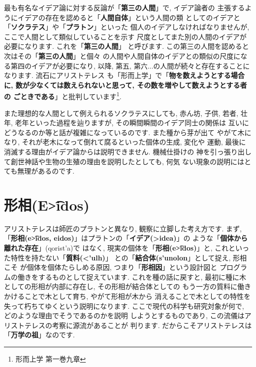 \documentclass[b5j,8pt,twocolumn]{ltjsarticle}
\newcommand{\textgreek}[1]{\begingroup\fontencoding{LGR}\selectfont#1\endgroup}
\begin{document}
最も有名なイデア論に対する反論が「\textbf{第三の人間}」で, イデア論者の
主張するようにイデアの存在を認めると「\textbf{人間自体}」という人間の類
としてのイデアと「\textbf{ソクラテス}」や「\textbf{プラトン}」といった
個人のイデアしなければなりませんが, ここで人間として類似していることを示す
尺度としてまた別の人間のイデアが必要になります. これを「\textbf{第三の人間}」
と呼びます. この第三の人間を認めると次はその「\textbf{第三の人間}」と個々
の人間や人間自体のイデアとの類似の尺度になる第四のイデアが必要になり, 以降,
 第五, 第六...の人間が続々と存在することになります.  流石にアリストテレス
も「形而上学」\cite{アリストテレス2}で「\textbf{物を数えようとする場合に,
 数が少なくては数えられないと思って, その数を増やして数えようとする者の
ごときである}」と批判しています\cite{アリストテレス2}\footnote{形而上学
 第一巻九章}.
\newline


また理想的な人間として例えられるソクラテスにしても, 赤ん坊, 子供, 若者,
 壮年, 老年といった過程を辿りますが, その瞬間瞬間のイデア同士の関係は
互いにどうなるのか等と話が複雑になっているのです. また種から芽が出て
やがて木になり, それが老木になって倒れて腐るといった個体の生成, 変化や
運動, 最後に消滅する理由がイデア論からは説明できません. 機械仕掛けの
神を引っ張り出して創世神話や生物の生殖の理由を説明したとしても, 何気
ない現象の説明にはとても無理があるのです.


\section{形相(\textgreek{E\t{>i}dos})}

アリストテレスは師匠のプラトンと異なり, 観察に立脚した考え方です.
 まず, 「\textbf{\textbf{形相(\textgreek{e\t{>i}dos},
 eidos)}}」はプラトンの「\textbf{イデア(\textgreek{>idea})}」の
ような「\textbf{個体から離れた存在}」(\textgreek{qorist'a})で
はなく, 現実の個体を「\textbf{形相(\textgreek{e\t{>i}dos})}」と,
 これといった特性を持たない「\textbf{質料(\textgreek{<'ulh})}」
との「\textbf{結合体(\textgreek{s'unolon}}」として捉え, 形相こそ
が個体を個体たらしめる原因, つまり「\textbf{形相因}」という設計図と
プログラムの働きをするものとして捉えています. これを種の話に戻すと,
 最初に種に木としての形相が内部に存在し, その形相が結合体としての
もう一方の質料に働きかけることで木として育ち, やがて形相が木から
消えることで木としての特性を失って朽ちてゆくという説明になります.
 ここで現代の科学も研究対象が何で, どのような理由でそうであるのかを説明
しようとするものであり, この流儀はアリストテレスの考察に源流があることが
判ります. だからこそアリストテレスは「\textbf{万学の祖}」なのです.
\newline
\end{document}
